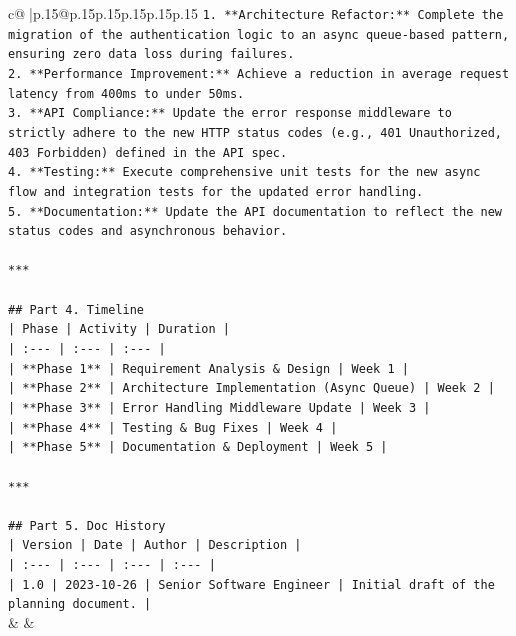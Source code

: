 \documentclass{article}
\begin{document}
{\begin{supertabular}{c@{$\;$}|p{.15\linewidth}@{}p{.15\linewidth}p{.15\linewidth}p{.15\linewidth}p{.15\linewidth}p{.15\linewidth}}
{{{\texttt{1.  **Architecture Refactor:** Complete the migration of the authentication logic to an async queue{-}based pattern, ensuring zero data loss during failures.} \\
\texttt{2.  **Performance Improvement:** Achieve a reduction in average request latency from 400ms to under 50ms.} \\
\texttt{3.  **API Compliance:** Update the error response middleware to strictly adhere to the new HTTP status codes (e.g., 401 Unauthorized, 403 Forbidden) defined in the API spec.} \\
\texttt{4.  **Testing:** Execute comprehensive unit tests for the new async flow and integration tests for the updated error handling.} \\
\texttt{5.  **Documentation:** Update the API documentation to reflect the new status codes and asynchronous behavior.} \\
\\ 
\texttt{***} \\
\\ 
\texttt{\#\# Part 4. Timeline} \\
\texttt{| Phase | Activity | Duration |} \\
\texttt{| :{-}{-}{-} | :{-}{-}{-} | :{-}{-}{-} |} \\
\texttt{| **Phase 1** | Requirement Analysis \& Design | Week 1 |} \\
\texttt{| **Phase 2** | Architecture Implementation (Async Queue) | Week 2 |} \\
\texttt{| **Phase 3** | Error Handling Middleware Update | Week 3 |} \\
\texttt{| **Phase 4** | Testing \& Bug Fixes | Week 4 |} \\
\texttt{| **Phase 5** | Documentation \& Deployment | Week 5 |} \\
\\ 
\texttt{***} \\
\\ 
\texttt{\#\# Part 5. Doc History} \\
\texttt{| Version | Date | Author | Description |} \\
\texttt{| :{-}{-}{-} | :{-}{-}{-} | :{-}{-}{-} | :{-}{-}{-} |} \\
\texttt{| 1.0 | 2023{-}10{-}26 | Senior Software Engineer | Initial draft of the planning document. |} \\
            }
        }
    }
    & & \\ \\


\end{supertabular}}
\end{document}
